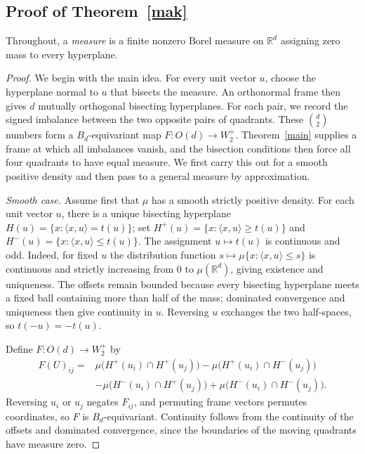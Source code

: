 \documentclass[12pt]{article}
\newcommand{\R}{\mathbb R}
\begin{document}
\subsection{Proof of Theorem~\ref{mak}}\label{sec:proof-mak}

Throughout, a \emph{measure} is a finite nonzero Borel measure on
$\R^d$ assigning zero mass to every hyperplane.

\begin{proof}
We begin with the main idea.  For every unit vector $u$, choose the
hyperplane normal to $u$ that
bisects the measure.  An orthonormal frame then gives $d$ mutually
orthogonal bisecting hyperplanes.  For each pair, we record the signed
imbalance between the two opposite pairs of quadrants.  These
$\binom d2$ numbers form a $B_d$-equivariant map
$F:O(d)\to W_2^+$.  Theorem~\ref{main} supplies a frame at which all
imbalances vanish, and the bisection conditions then force all four
quadrants to have equal measure.  We first carry this out for a smooth
positive density and then pass to a general measure by approximation.

\textit{Smooth case.}
Assume first that $\mu$ has a smooth strictly positive density.
For each unit vector $u$, there is a unique bisecting hyperplane
$H(u)=\{x:\langle x,u\rangle=t(u)\}$; set
$H^+(u)=\{x:\langle x,u\rangle\ge t(u)\}$ and
$H^-(u)=\{x:\langle x,u\rangle\le t(u)\}$.  The assignment $u\mapsto t(u)$ is
continuous and odd.  Indeed, for fixed $u$ the distribution function
$s\mapsto\mu\{x:\langle x,u\rangle\le s\}$ is continuous and strictly
increasing from $0$ to $\mu(\R^d)$, giving existence and uniqueness.
The offsets remain bounded because every bisecting hyperplane meets a
fixed ball containing more than half of the mass; dominated convergence
and uniqueness then give continuity in $u$.  Reversing $u$ exchanges the
two half-spaces, so $t(-u)=-t(u)$.

Define $F:O(d)\to W_2^+$ by
\[
 \begin{aligned}
 F(U)_{ij}={}&\mu\bigl(H^+(u_i)\cap H^+(u_j)\bigr)
            -\mu\bigl(H^+(u_i)\cap H^-(u_j)\bigr)\\
            &-\mu\bigl(H^-(u_i)\cap H^+(u_j)\bigr)
            +\mu\bigl(H^-(u_i)\cap H^-(u_j)\bigr).
 \end{aligned}
\]
Reversing $u_i$ or $u_j$ negates $F_{ij}$, and permuting frame
vectors permutes coordinates, so $F$ is $B_d$-equivariant.  Continuity
follows from the continuity of the offsets and dominated convergence,
since the boundaries of the moving quadrants have measure zero.


\end{proof}
\end{document}
